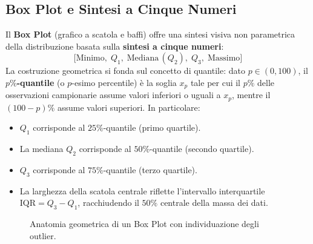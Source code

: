 \subsection{Box Plot e Sintesi a Cinque Numeri}
Il \textbf{Box Plot} (grafico a scatola e baffi) offre una sintesi visiva non parametrica della distribuzione basata sulla \textbf{sintesi a cinque numeri}:
\[
\big[\text{Minimo}, \; Q_1, \; \text{Mediana} \, (Q_2), \; Q_3, \; \text{Massimo}\big]
\]
La costruzione geometrica si fonda sul concetto di quantile: dato $p \in (0, 100)$, il \textbf{$p\%$-quantile} (o $p$-esimo percentile) \`e la soglia $x_p$ tale per cui il $p\%$ delle osservazioni campionarie assume valori inferiori o uguali a $x_p$, mentre il $(100-p)\%$ assume valori superiori. In particolare:
\begin{itemize}
    \item $Q_1$ corrisponde al $25\%$-quantile (primo quartile).
    \item La mediana $Q_2$ corrisponde al $50\%$-quantile (secondo quartile).
    \item $Q_3$ corrisponde al $75\%$-quantile (terzo quartile).
    \item La larghezza della scatola centrale riflette l'intervallo interquartile $\text{IQR} = Q_3 - Q_1$, racchiudendo il $50\%$ centrale della massa dei dati.
\end{itemize}

\begin{figure}[H]
\centering
{}
\caption{Anatomia geometrica di un Box Plot con individuazione degli outlier.}
\label{fig:boxplot-anatomy}
\end{figure}

